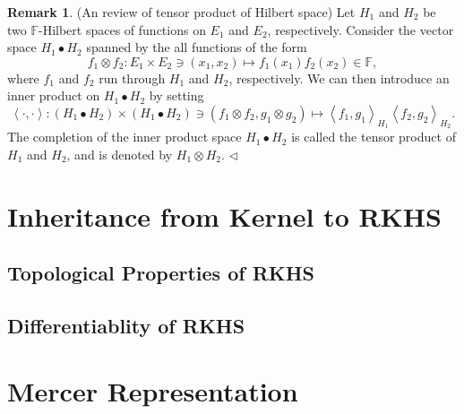 \documentclass[a4paper,12pt]{article}
\theoremstyle{remark}
\theoremstyle{definition}
\newtheorem{rem}[thm]{Remark}
\theoremstyle{definition}
\theoremstyle{definition}
\newcommand{\ip}[2]{\left<#1, #2 \right>}
\newcommand{\fin}{\hfill \( \triangleleft \) }
\begin{document}
\begin{rem} (An review of tensor product of Hilbert space)
	Let \( H_1 \) and \( H_2 \) be two \( \mathbb{F} \)-Hilbert spaces of functions on \( E_1 \) and \( E_2 \), respectively. Consider the vector space \( H_1 \bullet H_2 \) spanned by the all functions of the form
	\begin{equation*}
		f_1 \otimes f_2: E_1 \times E_2 \ni (x_1,x_2) \mapsto f_1(x_1)f_2(x_2) \in \mathbb{F},
	\end{equation*}
	where \( f_1 \) and \( f_2 \) run through \( H_1 \) and \( H_2 \), respectively.
	We can then introduce an inner product on \( H_1 \bullet H_2 \) by setting
	\begin{equation*}
		\ip{\cdot }{\cdot } : \left( H_1 \bullet H_2 \right) \times \left( H_1 \bullet H_2 \right) \ni (f_1 \otimes f_2, g_1 \otimes  g_2) \mapsto \ip{f_1}{g_1}_{H_1} \ip{f_2}{g_2}_{H_2}.
	\end{equation*}
	The completion of the inner product space \( H_1 \bullet H_2 \) is called the tensor product of \( H_1 \) and \( H_2 \), and is denoted by \( H_1 \otimes H_2 \).
	\fin\end{rem}


\section{Inheritance from Kernel to RKHS}
\subsection{Topological Properties of RKHS}
\subsection{Differentiablity of RKHS}

\section{Mercer Representation}


\end{document}
